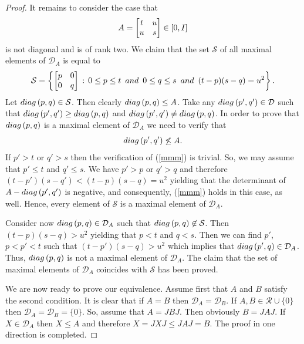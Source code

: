 \documentclass[10pt,a4paper]{amsart}
\begin{document}
\begin{proof}
It remains to consider the case that 
$$A =  \left[ \begin{matrix} t& u \cr u & s \cr \end{matrix} \right]  \in [0,I]
$$ 
is not diagonal and is of rank two. We claim that the set $\mathcal{S}$ of all maximal elements of
$\mathcal{D}_A$ is equal to
$$
\mathcal{S} = \left\{    \left[ \begin{matrix} p& 0 \cr 0 & q \cr \end{matrix} \right] \, : \, 0\le p \le t \ \, {\rm and} \ \, 0 \le q \le s \ \, {\rm and} \ \, (t-p)(s-q) = u^2 
\right\}. 
$$
Let ${\rm diag}\, (p,q) \in \mathcal{S}$. Then clearly ${\rm diag}\, (p,q) \le A$. Take any ${\rm diag}\, (p',q') \in \mathcal{D}$ such that ${\rm diag}\, (p',q') \ge {\rm diag}\, (p,q)$ and ${\rm diag}\, (p',q') \not= {\rm diag}\, (p,q)$. In order to prove that ${\rm diag}\, (p,q)$ is a maximal element of $\mathcal{D}_A$ we need to verify that \begin{equation}\label{mmm}{\rm diag}\, (p',q') \not\le A.\end{equation} If $p' > t$ or $q' > s$ then the verification of (\ref{mmm}) is trivial. So, we may assume that $p' \le t$ and $q' \le s$. We have $p' >p$ or $q' > q$ and therefore $(t-p')(s-q') < (t-p)(s-q) = u^2$ yielding that the determinant of $A - {\rm diag}\, (p',q')$ is negative, and consequently, (\ref{mmm}) holds in this case, as well. Hence, every element of $\mathcal{S}$ is a maximal element of $\mathcal{D}_A$.

Consider now ${\rm diag}\, (p,q) \in \mathcal{D}_A$ such that  ${\rm diag}\, (p,q) \not\in \mathcal{S}$. Then $(t-p)(s-q) > u^2$ yielding that $p <t$ and $q<s$. Then we can find $p'$, $p < p' < t$ such that 
$(t-p')(s-q) > u^2$ which implies that ${\rm diag}\, (p',q) \in \mathcal{D}_A$. Thus, ${\rm diag}\, (p,q)$ is not a maximal element of  $\mathcal{D}_A$. The claim that the set of maximal elements of $\mathcal{D}_A$  coincides with $\mathcal{S}$ has been proved.

We are now ready to prove our equivalence. Assume first that $A$ and $B$ satisfy the second condition. It is clear that if $A=B$ then 
$\mathcal{D}_A = \mathcal{D}_B$. If $A,B \in \mathcal{R} \cup \{ 0 \}$ then 
$\mathcal{D}_A = \mathcal{D}_B = \{ 0 \}$. So, assume that $A= JBJ$. Then obviously $B = JAJ$. If $X \in \mathcal{D}_A$ then $X \le A$ and therefore $X = JXJ  \le JAJ = B$. The proof in one direction is completed.


\end{proof}
\end{document}
